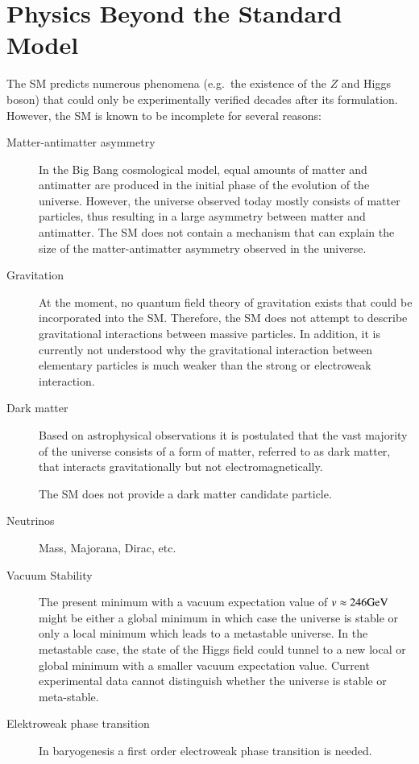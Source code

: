\section{Physics Beyond the Standard Model}

The SM predicts numerous phenomena (e.g.\ the existence of the $Z$ and Higgs
boson) that could only be experimentally verified decades after its
formulation. However, the SM is known to be incomplete for several reasons:
\begin{description}

\item[Matter-antimatter asymmetry] In the Big Bang cosmological model, equal
  amounts of matter and antimatter are produced in the initial phase of the
  evolution of the universe. However, the universe observed today mostly
  consists of matter particles, thus resulting in a large asymmetry between
  matter and antimatter. The SM does not contain a mechanism that can explain
  the size of the matter-antimatter asymmetry observed in the universe.

\item[Gravitation] At the moment, no quantum field theory of gravitation exists
  that could be incorporated into the SM. Therefore, the SM does not attempt to
  describe gravitational interactions between massive particles. In addition, it
  is currently not understood why the gravitational interaction between
  elementary particles is much weaker than the strong or electroweak
  interaction.

\item[Dark matter] Based on astrophysical observations it is postulated that the
  vast majority of the universe consists of a form of matter, referred to as
  dark matter, that interacts gravitationally but not electromagnetically.

  The SM does not provide a dark matter candidate particle.

\item[]

\item[Neutrinos] Mass, Majorana, Dirac, etc.

\end{description}



\begin{description}

\item[Vacuum Stability] The present minimum with a vacuum expectation
  value of $v \approx \si{246}{\ensuremath{\text{GeV}}}$ might be either a global minimum
  in which case the universe is stable or only a local minimum which
  leads to a metastable universe. In the metastable case, the state of
  the Higgs field could tunnel to a new local or global minimum with a
  smaller vacuum expectation value. Current experimental data cannot
  distinguish whether the universe is stable or
  meta-stable.

\item[Elektroweak phase transition] In baryogenesis a first order
  electroweak phase transition is needed.

\end{description}


